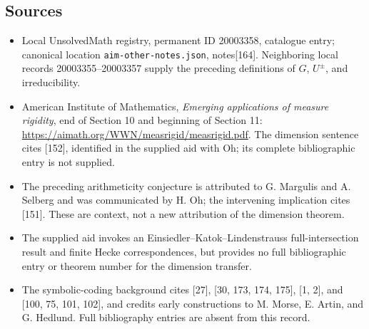 \documentclass[11pt]{article}
\begin{document}
\subsection{Sources}
\begin{itemize}
\item Local UnsolvedMath registry, permanent ID 20003358, catalogue entry; canonical location \texttt{aim-other-notes.json}, notes[164]. Neighboring local records 20003355--20003357 supply the preceding definitions of \(G\), \(U^\pm\), and irreducibility.
\item American Institute of Mathematics, \emph{Emerging applications of measure rigidity}, end of Section 10 and beginning of Section 11: \url{https://aimath.org/WWN/measrigid/measrigid.pdf}. The dimension sentence cites [152], identified in the supplied aid with Oh; its complete bibliographic entry is not supplied.
\item The preceding arithmeticity conjecture is attributed to G. Margulis and A. Selberg and was communicated by H. Oh; the intervening implication cites [151]. These are context, not a new attribution of the dimension theorem.
\item The supplied aid invokes an Einsiedler--Katok--Lindenstrauss full-intersection result and finite Hecke correspondences, but provides no full bibliographic entry or theorem number for the dimension transfer.
\item The symbolic-coding background cites [27], [30, 173, 174, 175], [1, 2], and [100, 75, 101, 102], and credits early constructions to M. Morse, E. Artin, and G. Hedlund. Full bibliography entries are absent from this record.
\end{itemize}
\end{document}
